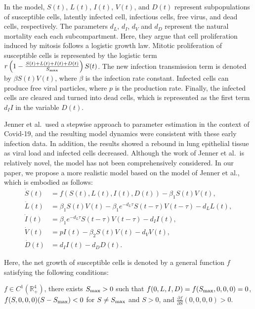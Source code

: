 \documentclass{CMHPhD-SIVD}
\begin{document}
In the model, $S(t)$, $L(t)$, $I(t)$, $V(t)$, and $D(t)$ represent subpopulations of susceptible cells, latently infected cell, infectious cells, free virus, and dead cells, respectively. The parameters $d_L$, $d_I$, $d_V$ and $d_D$ represent the natural mortality each each subcompartment. Here, they argue that cell proliferation induced by mitosis follows a logistic growth law. Mitotic proliferation of susceptible cells is represented by the logistic term $r \left(1-\frac{S(t)+L(t)+I(t)+D(t)}{S_{\text{max}}}\right)S(t)$.  The new infection transmission term is denoted by $\beta S(t)V(t)$, where $\beta$ is the infection rate constant. Infected cells can produce free viral particles, where $p$ is the production rate. Finally, the infected cells are cleared and turned into dead cells, which is represented as the first term $d_I I$ in the variable $D(t)$.


Jenner et al.\ used a stepwise approach to parameter estimation in the context of Covid-19, and the resulting model dynamics were consistent with these early infection data. In addition, the results showed a rebound in lung epithelial tissue as viral load and infected cells decreased. Although the work of Jenner et al.\ is relatively novel, the model has not been comprehensively considered. In our paper, we propose a more realistic model based on the model of Jenner et al., which is embodied as follows:
\begin{subequations}\label{SIVD}
   \begin{align}
		 \dot{S}(t) &= f(S(t), L(t), I(t), D(t))-\beta_1 S(t)V(t),
		 \label{SIVD-S}\\[3pt]
		 \dot{L}(t) &= \beta_1 S(t)V(t) - \beta_1 e^{-d_L \tau}S(t-\tau)V(t-\tau)-d_L L(t),
		 \label{SIVD-E}\\[3pt]
		 \dot{I}(t) &= \beta_1 e^{-d_L \tau}S(t-\tau)V(t-\tau)-d_I I(t),
		 \label{SIVD-I}\\[3pt]
				 \dot{V}(t) &= pI(t)-\beta_2 S(t)V(t)-d_V V(t),
		 \label{SIVD-V}\\[3pt]
		 \dot{D}(t) &= d_I I(t)-d_D D(t).
		 \label{SIVD-D}
   \end{align}
\end{subequations}

Here, the net growth of susceptible cells is denoted by a general function $f$ satisfying the following conditions:

  $f\in C^1(\mathbb{R}_+^4)$,
	there exists $S_{\text{max}}>0$ such that $f(0,L,I,D)=f(S_{\text{max}},0,0,0)=0$,
	$f(S,0,0,0)(S-S_{\text{max}})<0$ for $S\neq S_{\text{max}}$ and $S>0$, {} and $\frac{\partial f}{\partial S}(0,0,0,0)>0$.
\end{document}
